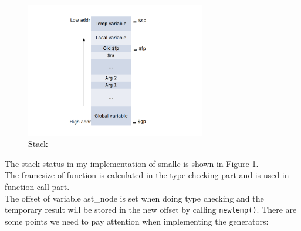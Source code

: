 \documentclass[a4paper]{article}
\begin{document}
\begin{figure}
  \centering
  \includegraphics[width=0.7\textwidth]{smallc-stack}
  \caption{Stack}
  \label{fig:stack}
\end{figure}

The stack status in my implementation of smallc is shown in Figure \ref{fig:stack}.\\

The framesize of function is calculated in the type checking part and is used in function call part.\\
The offset of variable ast\_node is set when doing type checking and the temporary result will be stored in the new offset by calling \texttt{newtemp()}. There are some points we need to pay attention when implementing the generators:
\end{document}
